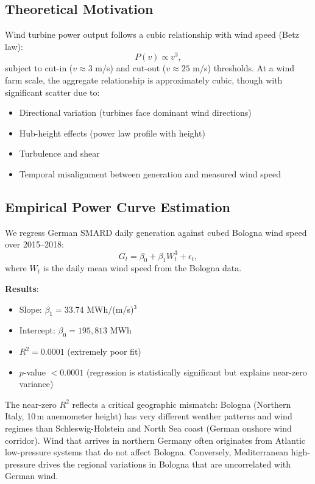 \documentclass[11pt, a4paper, twoside]{article}
\begin{document}
\subsection{Theoretical Motivation}

Wind turbine power output follows a cubic relationship with wind speed (Betz law):
\begin{equation}
P(v) \propto v^3,
\end{equation}
subject to cut-in ($v \approx 3$ m/s) and cut-out ($v \approx 25$ m/s) thresholds. At a wind farm scale, the aggregate relationship is approximately cubic, though with significant scatter due to:
\begin{itemize}
\item Directional variation (turbines face dominant wind directions)
\item Hub-height effects (power law profile with height)
\item Turbulence and shear
\item Temporal misalignment between generation and measured wind speed
\end{itemize}

\subsection{Empirical Power Curve Estimation}

We regress German SMARD daily generation against cubed Bologna wind speed over 2015--2018:
\begin{equation}
G_t = \beta_0 + \beta_1 W_t^3 + \epsilon_t,
\end{equation}
where $W_t$ is the daily mean wind speed from the Bologna data.

\textbf{Results}:
\begin{itemize}
\item Slope: $\beta_1 = 33.74$ MWh/(m/s)$^3$
\item Intercept: $\beta_0 = 195,813$ MWh
\item $R^2 = 0.0001$ (extremely poor fit)
\item $p$-value $< 0.0001$ (regression is statistically significant but explains near-zero variance)
\end{itemize}

The near-zero $R^2$ reflects a critical geographic mismatch: Bologna (Northern Italy, 10\,m anemometer height) has very different weather patterns and wind regimes than Schleswig-Holstein and North Sea coast (German onshore wind corridor). Wind that arrives in northern Germany often originates from Atlantic low-pressure systems that do not affect Bologna. Conversely, Mediterranean high-pressure drives the regional variations in Bologna that are uncorrelated with German wind.
\end{document}
